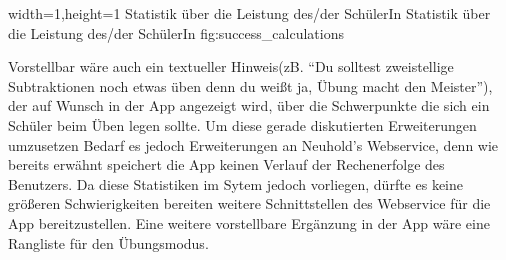   {width=1\textwidth,height=1\textheight}%
  {Statistik über die Leistung des/der SchülerIn}%
  {Statistik über die Leistung des/der SchülerIn}%
  {fig:success_calculations}%


Vorstellbar wäre auch ein textueller Hinweis(zB. \enquote{Du solltest zweistellige Subtraktionen noch 
etwas üben denn du weißt ja, Übung macht den Meister}), der auf Wunsch in der App angezeigt wird, über die
Schwerpunkte die sich ein Schüler beim Üben legen sollte. Um diese gerade diskutierten Erweiterungen 
umzusetzen Bedarf es jedoch Erweiterungen an Neuhold's Webservice, denn wie bereits
erwähnt speichert die App keinen Verlauf der Rechenerfolge des Benutzers. Da diese Statistiken im 
Sytem jedoch vorliegen, dürfte es keine größeren Schwierigkeiten bereiten weitere Schnittstellen
des Webservice für die App bereitzustellen.
Eine weitere vorstellbare Ergänzung in der App wäre eine Rangliste für den Übungsmodus.


